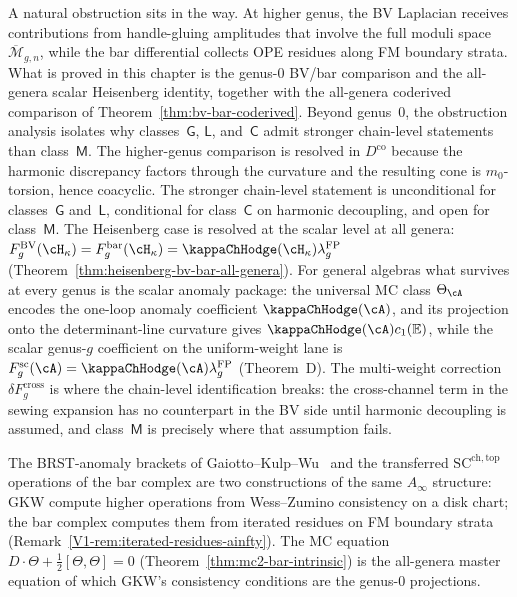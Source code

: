 A natural obstruction sits in the way. At higher genus, the BV
Laplacian receives contributions from handle-gluing amplitudes that
involve the full moduli space $\overline{\mathcal{M}}_{g,n}$, while
the bar differential collects OPE residues along FM boundary strata.
What is proved in this chapter is the genus-$0$ BV/bar comparison
and the all-genera scalar Heisenberg identity, together with the
all-genera coderived comparison of
Theorem~\ref{thm:bv-bar-coderived}. Beyond genus~$0$, the
obstruction analysis isolates why classes~$\mathsf{G}$,
$\mathsf{L}$, and~$\mathsf{C}$ admit stronger chain-level statements
than class~$\mathsf{M}$. The higher-genus comparison is resolved in
$D^{\mathrm{co}}$ because the harmonic discrepancy factors through
the curvature and the resulting cone is $m_0$-torsion, hence
coacyclic. The stronger chain-level statement is unconditional for
classes~$\mathsf{G}$ and~$\mathsf{L}$, conditional for
class~$\mathsf{C}$ on harmonic decoupling, and open for
class~$\mathsf{M}$. The Heisenberg case is resolved at the
scalar level at all genera:
$F_g^{\mathrm{BV}}(\cH_\kappa) = F_g^{\mathrm{bar}}(\cH_\kappa)
= \kappaChHodge(\cH_\kappa)\lambda_g^{\mathrm{FP}}$
\textup{(}Theorem~\ref{thm:heisenberg-bv-bar-all-genera}\textup{)}.
For general algebras what survives at every genus is the scalar
anomaly package: the universal MC class $\Theta_\cA$ encodes the
one-loop anomaly coefficient $\kappaChHodge(\cA)$, and its projection
onto the determinant-line curvature gives
$\kappaChHodge(\cA)c_1(\mathbb E)$, while the scalar genus-$g$
coefficient on the uniform-weight lane is
$F_g^{\mathrm{sc}}(\cA)
=\kappaChHodge(\cA)\lambda_g^{\mathrm{FP}}$
\textup{(}Theorem~D\textup{)}. The
multi-weight correction $\delta F_g^{\mathrm{cross}}$ is where the
chain-level identification breaks: the cross-channel term in the
sewing expansion has no counterpart in the BV side until
harmonic decoupling is assumed, and class~$\mathsf{M}$ is precisely
where that assumption fails.

\begin{remark}
\label{rem:brst-anomaly-gkw}
The BRST-anomaly brackets of Gaiotto--Kulp--Wu~\cite{GKW25}
and the transferred $\mathrm{SC}^{\mathrm{ch,top}}$ operations of
the bar complex are two constructions of the same $A_\infty$
structure: GKW compute higher operations from Wess--Zumino
consistency on a disk chart; the bar complex computes them from
iterated residues on FM boundary strata
(Remark~\ref{V1-rem:iterated-residues-ainfty}).
The MC equation $D \cdot \Theta + \tfrac{1}{2}[\Theta, \Theta] = 0$
(Theorem~\ref{thm:mc2-bar-intrinsic}) is the all-genera master
equation of which GKW's consistency conditions are the genus-$0$
projections.
\end{remark}

